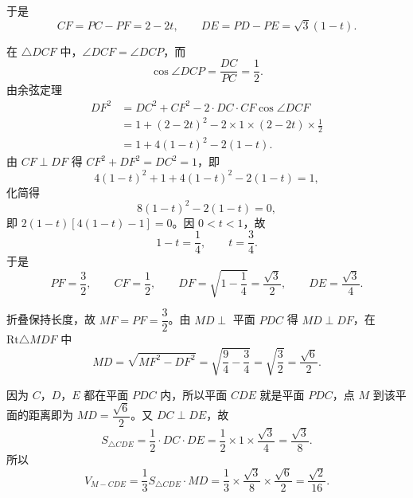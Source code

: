 \begin{answer}
于是
\nopagebreak[4]
\[CF=PC-PF=2-2t,\qquad DE=PD-PE=\sqrt3(1-t).\]

在 $\triangle DCF$ 中，$\angle DCF=\angle DCP$，而
\nopagebreak[4]
\[\cos\angle DCP=\frac{DC}{PC}=\frac12 .\]
由余弦定理
\nopagebreak[4]
\[\begin{aligned}
DF^2&=DC^2+CF^2-2\cdot DC\cdot CF\cos\angle DCF\\
&=1+(2-2t)^2-2\times1\times(2-2t)\times\frac12\\
&=1+4(1-t)^2-2(1-t).
\end{aligned}\]
由 $CF\perp DF$ 得 $CF^2+DF^2=DC^2=1$，即
\nopagebreak[4]
\[4(1-t)^2+1+4(1-t)^2-2(1-t)=1,\]
化简得
\nopagebreak[4]
\[8(1-t)^2-2(1-t)=0,\]
即 $2(1-t)\left[4(1-t)-1\right]=0$。因 $0<t<1$，故
\nopagebreak[4]
\[1-t=\frac14,\qquad t=\frac34 .\]
于是
\nopagebreak[4]
\[PF=\frac32,\qquad CF=\frac12,\qquad DF=\sqrt{1-\frac14}=\frac{\sqrt3}{2},\qquad DE=\frac{\sqrt3}{4}.\]

折叠保持长度，故 $MF=PF=\dfrac32$。由 $MD\perp$ 平面 $PDC$ 得 $MD\perp DF$，在 $\mathrm{Rt}\triangle MDF$ 中
\nopagebreak[4]
\[MD=\sqrt{MF^2-DF^2}=\sqrt{\frac94-\frac34}=\sqrt{\frac32}=\frac{\sqrt6}{2}.\]

因为 $C$，$D$，$E$ 都在平面 $PDC$ 内，所以平面 $CDE$ 就是平面 $PDC$，点 $M$ 到该平面的距离即为 $MD=\dfrac{\sqrt6}{2}$。又 $DC\perp DE$，故
\nopagebreak[4]
\[S_{\triangle CDE}=\frac12\cdot DC\cdot DE=\frac12\times1\times\frac{\sqrt3}{4}=\frac{\sqrt3}{8}.\]
所以
\nopagebreak[4]
\[V_{M-CDE}=\frac13S_{\triangle CDE}\cdot MD
=\frac13\times\frac{\sqrt3}{8}\times\frac{\sqrt6}{2}
=\frac{\sqrt2}{16}.\]



\end{answer}
